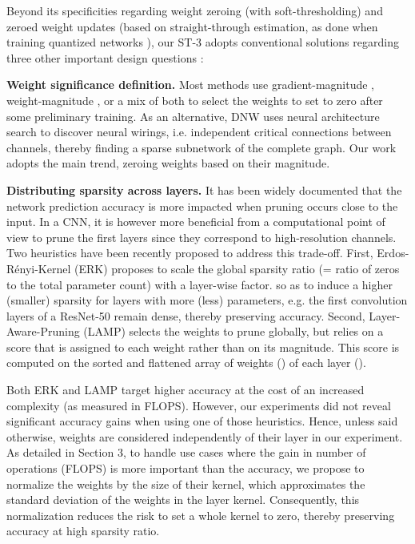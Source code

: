 \documentclass[10pt,twocolumn,letterpaper]{article}
\begin{document}
Beyond its specificities regarding weight zeroing (with soft-thresholding) and zeroed weight updates (based on straight-through estimation, as done when training quantized networks \cite{Hubara2016,Li2016}), our ST-3 adopts conventional solutions regarding three other important design questions : 

{\bf Weight significance definition.} Most methods use gradient-magnitude \cite{Evci2020}, weight-magnitude \cite{Han2015,Zhu2018,Kusupati2020}, or a mix of both \cite{Tanaka2020} to select the weights to set to zero after some preliminary training. As an alternative, DNW \cite{Wortsman2019} uses neural architecture search to discover neural wirings, i.e. independent critical connections between channels, thereby finding a sparse subnetwork of the complete graph. Our work adopts the main trend, zeroing weights based on their magnitude. 

{\bf Distributing sparsity across layers.}   It has been widely documented \cite{Mocanu2018,Evci2020,Lee2021} that the network prediction accuracy is more impacted when pruning occurs close to the input. In a CNN, it is however more beneficial from a computational point of view to prune the first layers since they correspond to high-resolution channels.
Two heuristics have been recently proposed to address this trade-off.
First, Erdos-Rényi-Kernel (ERK) \cite{Mocanu2018,Evci2020} proposes to scale the global sparsity ratio (= ratio of zeros to the total parameter count) with a layer-wise factor. so as to induce a higher (smaller) sparsity for layers with more (less) parameters, e.g. the first convolution layers of a ResNet-50 remain dense, thereby preserving accuracy. 
Second, Layer-Aware-Pruning (LAMP) \cite{Lee2021} selects the weights to prune globally, but relies on a score that is assigned to each weight rather than on its magnitude. 
This score is computed on the sorted and flattened array of weights () of each layer (). 


Both ERK and LAMP target higher accuracy at the cost of an increased complexity (as measured in FLOPS). However, our experiments did not reveal significant accuracy gains when using one of those heuristics. Hence, unless said otherwise, weights are considered independently of their layer in our experiment. As detailed in Section 3, to handle use cases where the gain in number of operations (FLOPS) is more important than the accuracy, we propose to normalize the weights by the size of their kernel, which approximates the standard deviation of the weights in the layer kernel. Consequently, this normalization reduces the risk to set a whole kernel to zero, thereby preserving accuracy at high sparsity ratio. 
\end{document}
